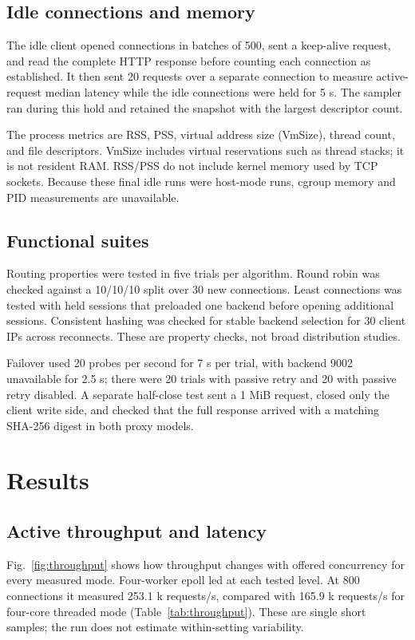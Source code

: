 \documentclass[conference]{IEEEtran}
\begin{document}
\subsection{Idle connections and memory}
The idle client opened connections in batches of 500, sent a keep-alive request, and read the complete HTTP response before counting each connection as established. It then sent 20 requests over a separate connection to measure active-request median latency while the idle connections were held for 5 s. The sampler ran during this hold and retained the snapshot with the largest descriptor count.

The process metrics are RSS, PSS, virtual address size (VmSize), thread count, and file descriptors. VmSize includes virtual reservations such as thread stacks; it is not resident RAM. RSS/PSS do not include kernel memory used by TCP sockets. Because these final idle runs were host-mode runs, cgroup memory and PID measurements are unavailable.

\subsection{Functional suites}
Routing properties were tested in five trials per algorithm. Round robin was checked against a 10/10/10 split over 30 new connections. Least connections was tested with held sessions that preloaded one backend before opening additional sessions. Consistent hashing was checked for stable backend selection for 30 client IPs across reconnects. These are property checks, not broad distribution studies.

Failover used 20 probes per second for 7 s per trial, with backend 9002 unavailable for 2.5 s; there were 20 trials with passive retry and 20 with passive retry disabled. A separate half-close test sent a 1 MiB request, closed only the client write side, and checked that the full response arrived with a matching SHA-256 digest in both proxy models.

\section{Results}
\subsection{Active throughput and latency}
Fig.~\ref{fig:throughput} shows how throughput changes with offered concurrency for every measured mode. Four-worker epoll led at each tested level. At 800 connections it measured 253.1 k requests/s, compared with 165.9 k requests/s for four-core threaded mode (Table~\ref{tab:throughput}). These are single short samples; the run does not estimate within-setting variability.
\end{document}
